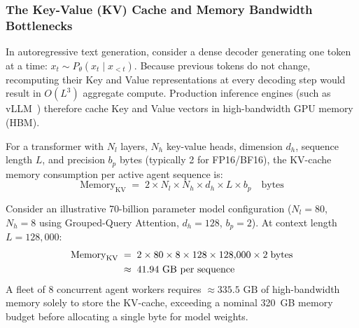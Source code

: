 \documentclass[11pt,a4paper]{article}
\begin{document}
\subsubsection{The Key-Value (KV) Cache and Memory Bandwidth Bottlenecks}
In autoregressive text generation, consider a dense decoder generating one token at a time: $x_{t} \sim P_\theta(x_t \mid x_{<t})$. Because previous tokens do not change, recomputing their Key and Value representations at every decoding step would result in $O(L^3)$ aggregate compute. Production inference engines (such as vLLM~) therefore cache Key and Value vectors in high-bandwidth GPU memory (HBM).

For a transformer with $N_l$ layers, $N_h$ key-value heads, dimension $d_h$, sequence length $L$, and precision $b_p$ bytes (typically 2 for FP16/BF16), the KV-cache memory consumption per active agent sequence is:
\begin{equation}\label{eq:kv-cache-full}
\mathrm{Memory}_{\mathrm{KV}} \;=\; 2 \times N_l \times N_h \times d_h \times L \times b_p \quad \text{bytes}
\end{equation}

Consider an illustrative 70-billion parameter model configuration ($N_l = 80$, $N_h = 8$ using Grouped-Query Attention, $d_h = 128$, $b_p = 2$). At context length $L = 128{,}000$:
\begin{align}
\mathrm{Memory}_{\mathrm{KV}} &\;=\; 2 \times 80 \times 8 \times 128 \times 128{,}000 \times 2 \;\text{bytes} \notag \\
&\;\approx\; 41.94\text{ GB per sequence}
\end{align}
A fleet of 8 concurrent agent workers requires $\approx 335.5\text{ GB}$ of high-bandwidth memory solely to store the KV-cache, exceeding a nominal 320~GB memory budget before allocating a single byte for model weights.
\end{document}
